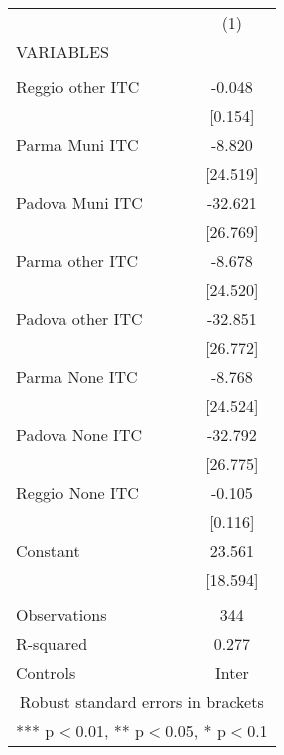 \begin{tabular}{lc} \hline
 & (1) \\
VARIABLES &  \\ \hline
 &  \\
Reggio other ITC & -0.048 \\
 & [0.154] \\
Parma Muni ITC & -8.820 \\
 & [24.519] \\
Padova Muni ITC & -32.621 \\
 & [26.769] \\
Parma other ITC & -8.678 \\
 & [24.520] \\
Padova other ITC & -32.851 \\
 & [26.772] \\
Parma None ITC & -8.768 \\
 & [24.524] \\
Padova None ITC & -32.792 \\
 & [26.775] \\
Reggio None ITC & -0.105 \\
 & [0.116] \\
Constant & 23.561 \\
 & [18.594] \\
 &  \\
Observations & 344 \\
R-squared & 0.277 \\
 Controls & Inter \\ \hline
\multicolumn{2}{c}{ Robust standard errors in brackets} \\
\multicolumn{2}{c}{ *** p$<$0.01, ** p$<$0.05, * p$<$0.1} \\
\end{tabular}
